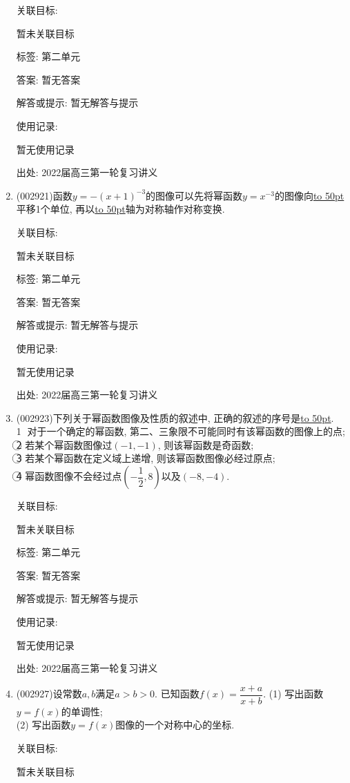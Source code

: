 \documentclass[10pt,a4paper]{article}
\newcommand{\blank}[1]{\underline{\hbox to #1pt{}}}
\begin{document}
\begin{enumerate}[1.]
关联目标:

暂未关联目标



标签: 第二单元

答案: 暂无答案

解答或提示: 暂无解答与提示

使用记录:

暂无使用记录


出处: 2022届高三第一轮复习讲义
\item { (002921)}函数$y=-(x+1)^{-3}$的图像可以先将幂函数$y=x^{-3}$的图像向\blank{50}平移1个单位, 再以\blank{50}轴为对称轴作对称变换.


关联目标:

暂未关联目标



标签: 第二单元

答案: 暂无答案

解答或提示: 暂无解答与提示

使用记录:

暂无使用记录


出处: 2022届高三第一轮复习讲义
\item { (002923)}下列关于幂函数图像及性质的叙述中, 正确的叙述的序号是\blank{50}.\\
\textcircled{1} 对于一个确定的幂函数, 第二、三象限不可能同时有该幂函数的图像上的点;\\
\textcircled{2} 若某个幂函数图像过$(-1,-1)$, 则该幂函数是奇函数;\\
\textcircled{3} 若某个幂函数在定义域上递增, 则该幂函数图像必经过原点;\\
\textcircled{4} 幂函数图像不会经过点$(-\dfrac 12,8)$以及$(-8,-4)$.


关联目标:

暂未关联目标



标签: 第二单元

答案: 暂无答案

解答或提示: 暂无解答与提示

使用记录:

暂无使用记录


出处: 2022届高三第一轮复习讲义
\item { (002927)}设常数$a,b$满足$a>b>0$. 已知函数$f(x)=\dfrac{x+a}{x+b}$.
(1) 写出函数$y=f(x)$的单调性;\\
(2) 写出函数$y=f(x)$图像的一个对称中心的坐标.


关联目标:

暂未关联目标




\end{enumerate}
\end{document}
